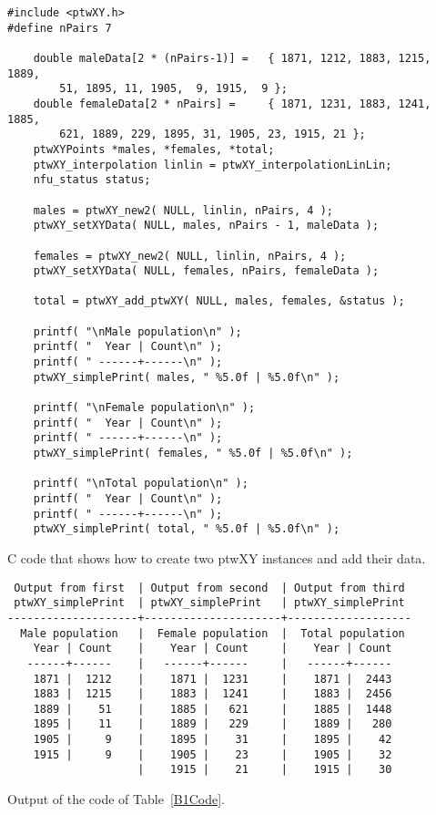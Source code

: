\documentclass[11pt]{article}
\begin{document}
\begin{table}
\begin{center}
\begin{verbatim}
#include <ptwXY.h>
#define nPairs 7

    double maleData[2 * (nPairs-1)] =   { 1871, 1212, 1883, 1215, 1889,  
        51, 1895, 11, 1905,  9, 1915,  9 };
    double femaleData[2 * nPairs] =     { 1871, 1231, 1883, 1241, 1885, 
        621, 1889, 229, 1895, 31, 1905, 23, 1915, 21 };
    ptwXYPoints *males, *females, *total;
    ptwXY_interpolation linlin = ptwXY_interpolationLinLin;
    nfu_status status;

    males = ptwXY_new2( NULL, linlin, nPairs, 4 );
    ptwXY_setXYData( NULL, males, nPairs - 1, maleData );

    females = ptwXY_new2( NULL, linlin, nPairs, 4 );
    ptwXY_setXYData( NULL, females, nPairs, femaleData );

    total = ptwXY_add_ptwXY( NULL, males, females, &status );

    printf( "\nMale population\n" );
    printf( "  Year | Count\n" );
    printf( " ------+------\n" );
    ptwXY_simplePrint( males, " %5.0f | %5.0f\n" );

    printf( "\nFemale population\n" );
    printf( "  Year | Count\n" );
    printf( " ------+------\n" );
    ptwXY_simplePrint( females, " %5.0f | %5.0f\n" );

    printf( "\nTotal population\n" );
    printf( "  Year | Count\n" );
    printf( " ------+------\n" );
    ptwXY_simplePrint( total, " %5.0f | %5.0f\n" );
\end{verbatim}
\end{center}
\caption{C code that shows how to create two ptwXY instances and add their data. \label{B1Code}}
\end{table}

\begin{table}
\begin{center}
\begin{verbatim}
 Output from first  | Output from second  | Output from third
 ptwXY_simplePrint  | ptwXY_simplePrint   | ptwXY_simplePrint
--------------------+---------------------+-------------------
  Male population   |  Female population  |  Total population
    Year | Count    |    Year | Count     |    Year | Count
   ------+------    |   ------+------     |   ------+------
    1871 |  1212    |    1871 |  1231     |    1871 |  2443
    1883 |  1215    |    1883 |  1241     |    1883 |  2456
    1889 |    51    |    1885 |   621     |    1885 |  1448
    1895 |    11    |    1889 |   229     |    1889 |   280
    1905 |     9    |    1895 |    31     |    1895 |    42
    1915 |     9    |    1905 |    23     |    1905 |    32
                    |    1915 |    21     |    1915 |    30
\end{verbatim}
\end{center}
\caption{Output of the code of Table~\ref{B1Code}. \label{B1Output}}
\end{table}
\end{document}
